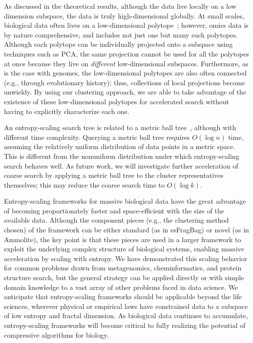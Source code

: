 \documentclass[review,preprint,12pt]{elsarticle}
\renewcommand{\cite}{\citep} %
\theoremstyle{definition}
\theoremstyle{remark}
\numberwithin{equation}{section}
\begin{document}
As discussed in the theoretical results, although the data live locally on a 
low dimension subspace, the data is truly high-dimensional globally.
At small scales, biological data often lives on a low-dimensional polytope~\cite{hart2015inferring}; however, omics data is by nature comprehensive, and includes not just one but many such polytopes.
Although each polytope can be individually projected onto a subspace using techniques such as PCA, the same projection cannot be used for all the polytopes at once because they live on \textit{different} low-dimensional 
subspaces.
Furthermore, as is the case with genomes, the low-dimensional polytopes are also often connected (e.g., through evolutionary history); thus, collections of local projections become unwieldy.
By using our clustering approach, we are able to take advantage of the existence of these low-dimensional polytopes for accelerated search without having to explicitly characterize each one.

An entropy-scaling search tree is related to a metric ball tree~\cite{uhlmann1991satisfying}, although with different time complexity.
Querying a metric ball tree requires $O(\log n)$ time, assuming the relatively uniform distribution of data points in a metric space.
This is different from the nonuniform distribution under which entropy-scaling
search behaves well.
As future work, we will investigate further acceleration of coarse search by
applying a metric ball tree to the cluster representatives themselves; this may reduce the coarse search time to $O(\log k)$.

Entropy-scaling frameworks for massive biological data have the great
advantage of becoming proportionately faster and space-efficient with the
size of the available data.
Although the component pieces (e.g., the clustering method chosen) of the framework can be either standard (as in esFragBag) or novel (as in Ammolite), the key point is that these pieces are used in a larger framework to exploit the underlying complex structure of biological systems, enabling massive acceleration by scaling with entropy.
We have demonstrated this scaling behavior for common problems drawn from
metagenomics, cheminformatics, and protein structure search, but the general strategy can be applied
directly or with simple domain knowledge to a vast array of other problems
faced in data science.
We anticipate that entropy-scaling frameworks should be applicable beyond
the life sciences, wherever physical or empirical laws have constrained data to 
a subspace of low entropy and fractal dimension.
As biological data continues to accumulate, entropy-scaling frameworks
will become critical to fully realizing the potential of compressive
algorithms for biology. 
\end{document}
